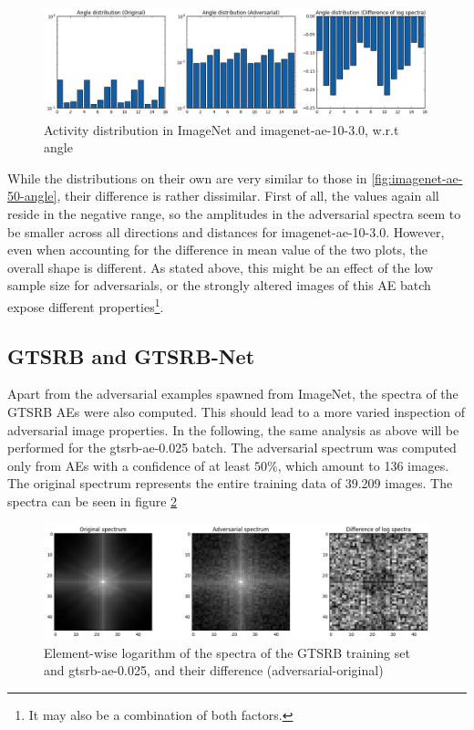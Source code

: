 \documentclass[11pt, a4paper]{article}
\begin{document}
\begin{figure}[htb]
	\centering
	\includegraphics[width=\textwidth]{images/spectra/imagenet-ae-10-3dot0-minconfidence-0dot9-maxorig-20000-angle-16-bins.png}
	\caption{Activity distribution in ImageNet and imagenet-ae-10-3.0, w.r.t angle}
	\label{fig:imagenet-ae-10-3dot0-angle}
\end{figure}

While the distributions on their own are very similar to those in \ref{fig:imagenet-ae-50-angle}, their difference is rather dissimilar. First of all, the values again all reside in the negative range, so the amplitudes in the adversarial spectra seem to be smaller across all directions and distances for imagenet-ae-10-3.0. However, even when accounting for the difference in mean value of the two plots, the overall shape is different. As stated above, this might be an effect of the low sample size for adversarials, or the strongly altered images of this AE batch expose different properties\footnote{It may also be a combination of both factors.}.

\subsection{GTSRB and GTSRB-Net}
Apart from the adversarial examples spawned from ImageNet, the spectra of the GTSRB AEs were also computed. This should lead to a more varied inspection of adversarial image properties. In the following, the same analysis as above will be performed for the gtsrb-ae-0.025 batch. The adversarial spectrum was computed only from AEs with a confidence of at least $50\%$, which amount to 136 images. The original spectrum represents the entire training data of 39.209 images. The spectra can be seen in figure \ref{fig:gtsrb-ae-0dot025-spectra}

\begin{figure}[htb]
	\centering
	\includegraphics[width=\textwidth]{images/spectra/gtsrb-ae-0dot025-minconfidence-0dot5-maxorig-0-spectra.png}
	\caption{Element-wise logarithm of the spectra of the GTSRB training set and gtsrb-ae-0.025, and their difference (adversarial-original)}
	\label{fig:gtsrb-ae-0dot025-spectra}
\end{figure}
\end{document}
